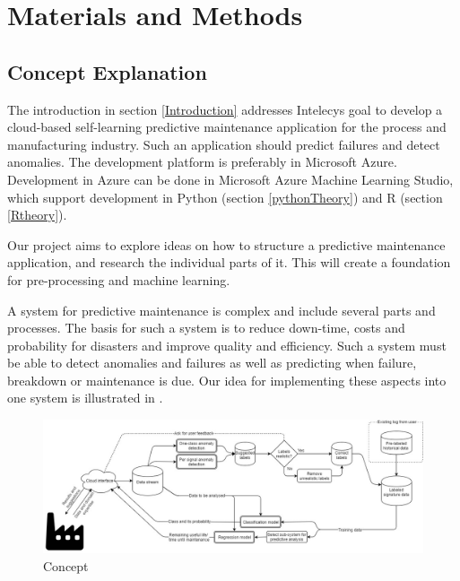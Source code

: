 \documentclass[english, a4paper]{report}
\begin{document}
\chapter{Materials and Methods}
{
    \section{Concept Explanation}\label{concept}
    {
        The introduction in section \ref{Introduction} addresses Intelecys goal to develop a cloud-based self-learning predictive maintenance application for the process and manufacturing industry. Such an application should predict failures and detect anomalies. The development platform is preferably in Microsoft Azure. Development in Azure can be done in Microsoft Azure Machine Learning Studio, which support development in Python (section \ref{pythonTheory}) and R (section \ref{Rtheory}).   
        \par  
        Our project aims to explore ideas on how to structure a predictive maintenance application, and research the individual parts of it. This will create a foundation for pre-processing and machine learning.
        \par
        A system for predictive maintenance is complex and include several parts and processes. The basis for such a system is to reduce down-time, costs and probability for disasters and improve quality and efficiency. Such a system must be able to detect anomalies and failures as well as predicting when failure, breakdown or maintenance is due. Our idea for implementing these aspects into one system is illustrated in .
        
        \begin{figure}[H]
            \centering
            \includegraphics[width=\textwidth]{process}
            \caption{Concept}
            \label{fig:processConcept}
        \end{figure}
        
}}
\end{document}
